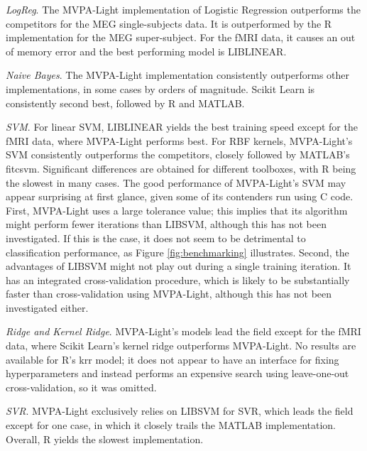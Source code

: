 \documentclass[utf8]{frontiersSCNS} %
\begin{document}
\textit{LogReg}. The MVPA-Light implementation of Logistic Regression outperforms the competitors for the MEG single-subjects data. It is outperformed by the R implementation for the MEG super-subject. For the fMRI data, it causes an out of memory error and the best performing model is LIBLINEAR.

\textit{Naive Bayes}. The MVPA-Light implementation consistently outperforms other implementations, in some cases by orders of magnitude. Scikit Learn is consistently second best, followed by R and MATLAB.

\textit{SVM}. For linear SVM, LIBLINEAR yields the best training speed except for the fMRI data, where MVPA-Light performs best. For RBF kernels, MVPA-Light's SVM consistently outperforms the competitors, closely followed by MATLAB's fitcsvm. Significant differences are obtained for different toolboxes, with R being the slowest in many cases. The good performance of MVPA-Light's SVM may appear surprising at first glance, given some of its contenders run using C code. First, MVPA-Light uses a large tolerance value; this implies that its algorithm might perform fewer iterations than LIBSVM, although this has not been investigated. If this is the case, it does not seem to be detrimental to classification performance, as Figure \ref{fig:benchmarking} illustrates. Second, the advantages of LIBSVM might not play out during a single training iteration. It has an integrated cross-validation procedure, which is likely to be substantially faster than cross-validation using MVPA-Light, although this has not been investigated either.

\textit{Ridge and Kernel Ridge}. MVPA-Light's models lead the field except for the fMRI data, where Scikit Learn's kernel ridge outperforms MVPA-Light. No results are available for R's krr model; it does not appear to have an interface for fixing hyperparameters and instead performs an expensive search using leave-one-out cross-validation, so it was omitted.

\textit{SVR}. MVPA-Light exclusively relies on LIBSVM for SVR, which leads the field except for one case, in which it closely trails the MATLAB implementation. Overall, R yields the slowest implementation.
\end{document}
